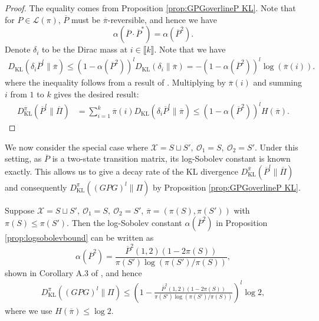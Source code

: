 \documentclass[EJP]{ejpecp} %
\begin{document}
\begin{proof}
    The equality comes from Proposition \ref{prop:GPGoverlineP KL}. Note that for $P \in \mathcal{L}(\pi)$, $\overline{P}$ must be $\overline{\pi}$-reversible, and hence we have $$\alpha\left(\overline{P}\cdot \overline{P}^*\right) = \alpha\left(\overline{P}^2\right).$$
    Denote $\delta_i$ to be the Dirac mass at $i \in \llbracket k \rrbracket$. Note that we have
    \begin{align*}
        D_{\mathrm{KL}}(\delta_i \overline{P}^l \| \overline{\pi}) \leq \left(1-\alpha\left(\overline{P}^2\right)\right)^l D_{\mathrm{KL}}(\delta_i \| \overline{\pi}) = - \left(1-\alpha\left(\overline{P}^2\right)\right)^l  \log (\overline{\pi}(i)).
    \end{align*}
    where the inequality follows from a result of \cite[Remark on Page 725]{diaconis_logsobolev}. Multiplying by $\overline{\pi}(i)$ and summing $i$ from $1$ to $k$ gives the desired result:
    \begin{align*}
        D_{\mathrm{KL}}^{\overline\pi} \left( \overline{P}^l \| \overline{\Pi}\right) &= \sum_{i=1}^k \overline{\pi}(i) D_{\mathrm{KL}}(\delta_i \overline{P}^l \| \overline{\pi}) \leq \left(1-\alpha\left(\overline{P}^2\right)\right)^l H(\overline{\pi}).
    \end{align*}
\end{proof}

We now consider the special case where $\mathcal{X} = S \sqcup S',\ \mathcal{O}_1 = S,\ \mathcal{O}_2 = S'$. Under this setting, as $\overline{P}$ is a two-state transition matrix, its log-Sobolev constant is known exactly. This allows us to give a decay rate of the KL divergence $D_{\mathrm{KL}}^{\overline\pi} \left( \overline{P}^l \| \overline{\Pi}\right)$ and consequently $D_{\mathrm{KL}}^\pi \left((GPG)^l \| \Pi \right)$ by Proposition \ref{prop:GPGoverlineP KL}.

\begin{corollary}
    Suppose $\mathcal{X} = S \sqcup S',\ \mathcal{O}_1 = S,\ \mathcal{O}_2 = S'$, $\overline{\pi} = (\pi(S), \pi(S'))$ with $\pi(S) \leq \pi(S')$. Then the log-Sobolev constant $\alpha\left(\overline{P}^2\right)$ in Proposition \ref{prop:logsobolevbound} can be written as
    $$\alpha\left(\overline{P}^2\right) = \frac{\overline{P}^2(1,2)(1 - 2\pi(S))}{\pi(S')\log(\pi(S')/\pi(S))},$$
    shown in Corollary A.3 of \cite{diaconis_logsobolev}, and hence
    \begin{align*}
       D_{\mathrm{KL}}^\pi \left((GPG)^l \| \Pi \right) \leq \left(1 -  \frac{\overline{P}^2(1,2)(1 - 2\pi(S))}{\pi(S')\log(\pi(S')/\pi(S))}\right)^l \log 2,
    \end{align*}
    where we use $H(\overline{\pi}) \leq \log 2$.
\end{corollary}
\end{document}
